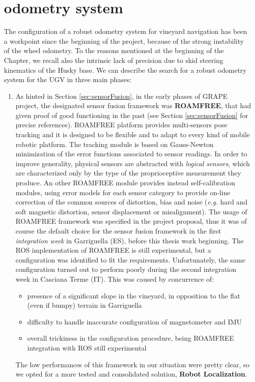 \section{odometry system}\label{sec:odometrySystem}

The configuration of a robust odometry system for vineyard navigation has been a workpoint since the beginning of the project, because of the strong instability of the wheel odometry. To the reasons mentioned at the beginning of the Chapter, we recall also the intrinsic lack of precision due to skid steering kinematics of the Husky base.
We can describe the search for a robust odometry system for the \ac{UGV} in three main phases:
\begin{enumerate}
	\item As hinted in Section \ref{sec:sensorFusion}, in the early phases of \ac{GRAPE} project, the designated sensor fusion framework was \textbf{ROAMFREE}, that had given proof of good functioning in the past (see Section \ref{sec:sensorFusion} for precise references). ROAMFREE platform provides multi-sensors pose tracking and it is designed to be flexible and to adapt to every kind of mobile robotic platform. The tracking module is based on Gauss-Newton minimization of the error functions associated to sensor readings. In order to improve generality, physical sensors are abstracted with \textit{logical sensors}, which are characterized only by the type of the proprioceptive measurement they produce. An other ROAMFREE module provides instead self-calibration modules, using error models for each sensor category to provide on-line correction of the common sources of distortion, bias and noise (\textit{e.g.} hard and soft magnetic distortion, sensor displacement or misalignment). The usage of ROAMFREE framework was specified in the project proposal, thus it was of course the default choice for the sensor fusion framework in the first \textit{integration week} in Garriguella (ES), before this thesis work beginning. The \ac{ROS} implementation of ROAMFREE is still experimental, but a configuration was identified to fit the requirements. Unfortunately, the same configuration turned out to perform poorly during the second integration week in Casciana Terme (IT). This was caused by concurrence of:
	\begin{itemize}
		\item presence of a significant slope in the vineyard, in opposition to the flat (even if bumpy) terrain in Garriguella
		\item difficulty to handle inaccurate configuration of magnetometer and \ac{IMU}
		\item overall trickiness in the configuration procedure, being ROAMFREE integration with \ac{ROS} still experimental
	\end{itemize}
	The low performances of this framework in our situation were pretty clear, so we opted for a more tested and consolidated solution, \textbf{Robot Localization}.
	

\end{enumerate}
